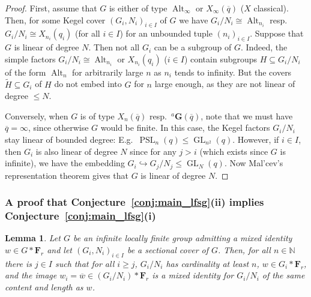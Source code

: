 \documentclass[a4paper,12pt]{amsproc}
\DeclareMathOperator{\GL}{GL}%
\DeclareMathOperator{\PSL}{PSL}%
\DeclareMathOperator{\Alt}{Alt}%
\theoremstyle{plain}
\newtheorem{lemma}[definition]{Lemma}
\theoremstyle{definition}
\begin{document}
\begin{proof}
First, assume that $G$ is either of type $\Alt_\infty$ or $X_\infty(\overline{q})$ ($X$ classical). Then, for some Kegel cover $(G_i,N_i)_{i\in I}$ of $G$ we have $G_i/N_i\cong \Alt_{n_i}$ resp.\ $G_i/N_i\cong X_{n_i}(q_i)$ (for all $i\in I$) for an unbounded tuple $(n_i)_{i\in I}$. Suppose that $G$ is linear of degree $N$. Then not all $G_i$ can be a subgroup of $G$. Indeed, the simple factors $G_i/N_i\cong \Alt_{n_i}$ or $X_{n_i}(q_i)$ ($i\in I$) contain subgroups $H\subseteq G_i/N_i$ of the form $\Alt_n$ for arbitrarily large $n$ as $n_i$ tends to infinity. But the covers $\widetilde{H}\subseteq G_i$ of $H$ do not embed into $G$ for $n$ large enough, as they are not linear of degree $\leq N$.

Conversely, when $G$ is of type $X_n(\overline{q})$ resp.\ ${}^a\mathbf{G}(\overline{q})$, note that we must have $\overline{q}=\infty$, since otherwise $G$ would be finite. In this case, the Kegel factors $G_i/N_i$ stay linear of bounded degree:  E.g.\ $\PSL_n(q)\leq\GL_{n^2}(q)$. However, if $i\in I$, then $G_i$ is also linear of degree $N$ since for any $j>i$ (which exists since $G$ is infinite), we have the embedding $G_i\hookrightarrow G_j/N_j\leq\GL_N(q)$. Now Mal'cev's representation theorem gives that $G$ is linear of degree $N$.
\end{proof}

\subsubsection{A proof that Conjecture~\ref{conj:main_lfsg}(ii) implies Conjecture~\ref{conj:main_lfsg}(i)}

\begin{lemma}\label{lem:inf_loc_smpl_grp_non_trv_id}
Let $G$ be an infinite locally finite group admitting a mixed identity $w \in G\ast\mathbf{F}_r$ and let $(G_i,N_i)_{i\in I}$ be a sectional cover of $G$. Then, for all $n\in\mathbb{N}$ there is $j\in I$ such that for all $i \geq j$, $G_i/N_i$ has cardinality at least $n$, $w\in G_i\ast\mathbf{F}_r$, and the image $w_i=\overline{w}\in (G_i/N_i)\ast\mathbf{F}_r$ is a mixed identity for $G_i/N_i$ of the same content and length as $w$.
\end{lemma}
	
\end{document}

